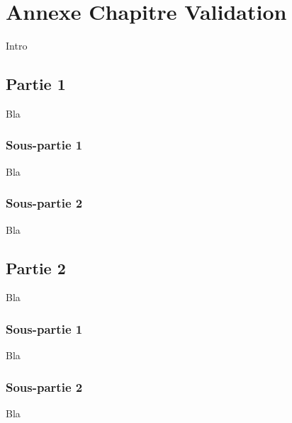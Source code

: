 \chapter*{Annexe Chapitre Validation}

\makeatletter
\renewcommand{\thesection}{\@arabic\c@section}
\makeatother

\setcounter{section}{0}

Intro

\section{Partie 1}

Bla

\subsection{Sous-partie 1}

Bla

\subsection{Sous-partie 2}

Bla

\section{Partie 2}

Bla

\subsection{Sous-partie 1}

Bla

\subsection{Sous-partie 2}

Bla

